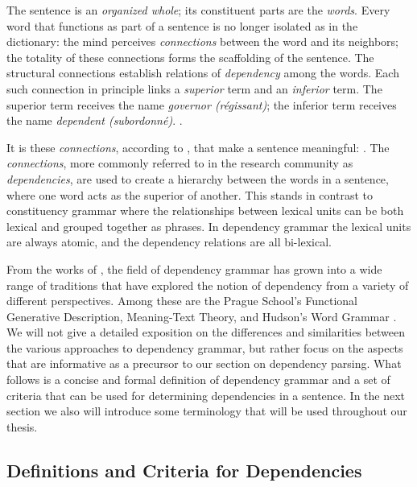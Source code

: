 \begin{displayquote}
The sentence is an \textit{organized whole}; its constituent parts are the \textit{words}. Every word that functions as part of a sentence is no longer isolated as in the dictionary: the mind perceives \textit{connections} between the word and its neighbors; the totality of these connections forms the scaffolding of the sentence. The structural connections establish relations of \textit{dependency} among the words. Each such connection in principle links a \textit{superior} term and an \textit{inferior} term. The superior term receives the name \textit{governor (r\'{e}gissant)}; the inferior term receives the name \textit{dependent (subordonn\'{e})}. \cite{Tes:15}.
\end{displayquote}

It is these \textit{connections}, according to \citeauthor{Tes:15}, that make a sentence meaningful:  \cite{Tes:15}. The \textit{connections}, more commonly referred to in the research community as \textit{dependencies}, are used to create a hierarchy between the words in a sentence, where one word acts as the superior of another. This stands in contrast to constituency grammar where the relationships between lexical units can be both lexical and grouped together as phrases. In dependency grammar the lexical units are always atomic, and the dependency relations are all bi-lexical. 

From the works of \citeauthor{Tes:15}, the field of dependency grammar has grown into a wide range of traditions that have explored the notion of dependency from a variety of different perspectives. Among these are the Prague School's Functional Generative Description, Meaning-Text Theory, and Hudson's Word Grammar \cite{Sgall:86, Mel:88, Hudson:90}. We will not give a detailed exposition on the differences and similarities between the various approaches to dependency grammar, but rather focus on the aspects that are informative as a precursor to our section on dependency parsing. What follows is a concise and formal definition of dependency grammar and a set of criteria that can be used for determining dependencies in a sentence. In the next section we also will introduce some terminology that will be used throughout our thesis.

\subsection{Definitions and Criteria for Dependencies}
\label{definitions}

